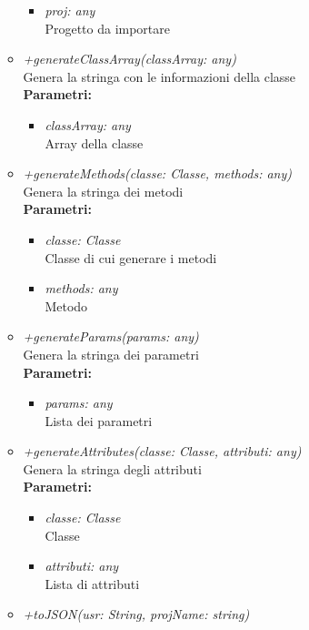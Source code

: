 \begin{itemize}
\begin{itemize}
\begin{itemize}
    			\item \emph{proj: any}\\
    			Progetto da importare
    		\end{itemize}
    		\item \emph{+generateClassArray(classArray: any)}\\
    		Genera la stringa con le informazioni della classe\\
    		\textbf{Parametri:}
    		\begin{itemize}
    			\item \emph{classArray: any}\\
    			Array della classe
    		\end{itemize}
    		\item \emph{+generateMethods(classe: Classe, methods: any)}\\
    		Genera la stringa dei metodi\\
    		\textbf{Parametri:}
    		\begin{itemize}
    			\item \emph{classe: Classe}\\
    			Classe di cui generare i metodi
    			\item \emph{methods: any}\\
    			Metodo
    		\end{itemize}
    		\item \emph{+generateParams(params: any)}\\
    		Genera la stringa dei parametri\\
    		\textbf{Parametri:}
    		\begin{itemize}
    			\item \emph{params: any}\\
    			Lista dei parametri
    		\end{itemize}
    		\item \emph{+generateAttributes(classe: Classe, attributi: any)}\\
    		Genera la stringa degli attributi\\
    		\textbf{Parametri:}
    		\begin{itemize}
    			\item \emph{classe: Classe}\\
    			Classe
    			\item \emph{attributi: any}\\
    			Lista di attributi
    		\end{itemize}
    		\item \emph{+toJSON(usr: String, projName: string)}\\

\end{itemize}
\end{itemize}
